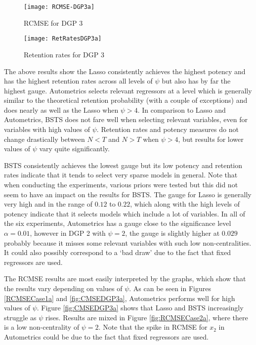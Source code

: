 \begin{figure}[h]

\begin{minipage}{.5\textwidth}
\centering
\texttt{[image: RCMSE-DGP3a]}
\caption{RCMSE for DGP 3}
\label{fig:CMSEDGP3a}
\end{minipage}%
\begin{minipage}{.5\textwidth}
\centering
\texttt{[image: RetRatesDGP3a]}
\caption{Retention rates for DGP 3}
\label{fig:RetRatesDGP3a}

\end{minipage}

\end{figure}

\clearpage

The above results show the Lasso consistently achieves the highest potency and has the highest retention rates across all levels of $\psi$ but also has by far the highest gauge. Autometrics selects relevant regressors at a level which is generally similar to the theoretical retention probability (with a couple of exceptions) and does nearly as well as the Lasso when $\psi>4$. In comparison to Lasso and Autometrics, BSTS does not fare well when selecting relevant variables, even for variables with high values of $\psi$. Retention rates and potency measures do not change drastically between $N<T$ and $N>T$ when $\psi>4$, but results for lower values of $\psi$ vary quite significantly. 

BSTS consistently achieves the lowest gauge but its low potency and retention rates indicate that it tends to select very sparse models in general. Note that when conducting the experiments, various priors were tested but this did not seem to have an impact on the results for BSTS. The gauge for Lasso is generally very high and in the range of $0.12$ to $0.22$, which along with the high levels of potency indicate that it selects models which include a lot of variables. In all of the six experiments, Autometrics has a gauge close to the significance level $\alpha = 0.01$, however in DGP 2 with $\psi = 2$, the gauge is slightly higher at $0.029$ probably because it misses some relevant variables with such low non-centralities. It could also possibly correspond to a `bad draw' due to the fact that fixed regressors are used. 

The RCMSE results are most easily interpreted by the graphs, which show that the results vary depending on values of $\psi$. As can be seen in Figures \ref{RCMSECase1a} and \ref{fig:CMSEDGP3a}, Autometrics performs well for high values of $\psi$. Figure \ref{fig:CMSEDGP3a} shows that Lasso and BSTS increasingly struggle as $\psi$ rises. Results are mixed in Figure \ref{fig:RCMSECase2a}, where there is a low non-centrality of $\psi=2$. Note that the spike in RCMSE for $x_{2}$ in Autometrics could be due to the fact that fixed regressors are used. 

